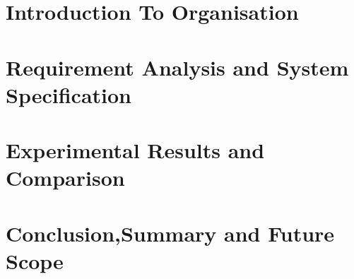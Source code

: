 \documentclass{report}
\begin{document}



\footskip 0.7cm
\thispagestyle{empty} 
\pagetitle
\newpage
{}
\cfoot{\thepage}


\newpage



\newpage
\tableofcontents
\newpage
\listoffigures
\newpage

\cfoot{\thepage}

\newpage
\chapter{Introduction To Organisation}

\newpage
\chapter{Requirement Analysis and System Specification}




\chapter{Experimental Results and Comparison}

\chapter{Conclusion,Summary and Future Scope}



\end{document}
